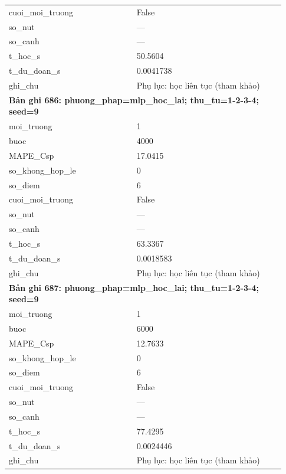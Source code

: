 \begin{longtable}{p{0.43\linewidth}p{0.50\linewidth}}
cuoi\_\allowbreak moi\_\allowbreak truong & False \\
so\_\allowbreak nut & — \\
so\_\allowbreak canh & — \\
t\_\allowbreak hoc\_\allowbreak s & 50.5604 \\
t\_\allowbreak du\_\allowbreak doan\_\allowbreak s & 0.0041738 \\
ghi\_\allowbreak chu & Phụ lục: học liên tục (tham khảo) \\
\midrule
\multicolumn{2}{p{0.95\linewidth}}{\textbf{Bản ghi 686: phuong\_phap=mlp\_hoc\_lai; thu\_tu=1-2-3-4; seed=9}} \\
moi\_\allowbreak truong & 1 \\
buoc & 4000 \\
MAPE\_\allowbreak Csp & 17.0415 \\
so\_\allowbreak khong\_\allowbreak hop\_\allowbreak le & 0 \\
so\_\allowbreak diem & 6 \\
cuoi\_\allowbreak moi\_\allowbreak truong & False \\
so\_\allowbreak nut & — \\
so\_\allowbreak canh & — \\
t\_\allowbreak hoc\_\allowbreak s & 63.3367 \\
t\_\allowbreak du\_\allowbreak doan\_\allowbreak s & 0.0018583 \\
ghi\_\allowbreak chu & Phụ lục: học liên tục (tham khảo) \\
\midrule
\multicolumn{2}{p{0.95\linewidth}}{\textbf{Bản ghi 687: phuong\_phap=mlp\_hoc\_lai; thu\_tu=1-2-3-4; seed=9}} \\
moi\_\allowbreak truong & 1 \\
buoc & 6000 \\
MAPE\_\allowbreak Csp & 12.7633 \\
so\_\allowbreak khong\_\allowbreak hop\_\allowbreak le & 0 \\
so\_\allowbreak diem & 6 \\
cuoi\_\allowbreak moi\_\allowbreak truong & False \\
so\_\allowbreak nut & — \\
so\_\allowbreak canh & — \\
t\_\allowbreak hoc\_\allowbreak s & 77.4295 \\
t\_\allowbreak du\_\allowbreak doan\_\allowbreak s & 0.0024446 \\
ghi\_\allowbreak chu & Phụ lục: học liên tục (tham khảo) \\

\end{longtable}
